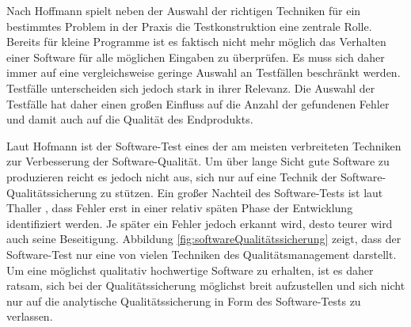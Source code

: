 Nach Hoffmann \cite[vgl. S.22]{hoffmann_software-qualitat_2013} spielt neben der Auswahl der richtigen Techniken für ein bestimmtes Problem in der Praxis die Testkonstruktion eine zentrale Rolle. Bereits für kleine Programme ist es faktisch nicht mehr möglich das Verhalten einer Software für alle möglichen Eingaben zu überprüfen. Es muss sich daher immer auf eine vergleichsweise geringe Auswahl an Testfällen beschränkt werden. Testfälle unterscheiden sich jedoch stark in ihrer Relevanz. Die Auswahl der Testfälle hat daher einen großen Einfluss auf die Anzahl der gefundenen Fehler und damit auch auf die Qualität des Endprodukts. 

Laut Hofmann \cite[vgl. S.22]{hoffmann_software-qualitat_2013} ist der Software-Test eines der am meisten verbreiteten Techniken zur Verbesserung der Software-Qualität. Um über lange Sicht gute Software zu produzieren reicht es jedoch nicht aus, sich nur auf eine Technik der Software-Qualitätssicherung zu stützen. Ein großer Nachteil des Software-Tests ist laut Thaller \cite[vgl. S.18]{thaller_software-test_2002}, dass Fehler erst in einer relativ späten Phase der Entwicklung identifiziert werden. Je später ein Fehler jedoch erkannt wird, desto teurer wird auch seine Beseitigung. Abbildung \ref{fig:softwareQualitätssicherung} zeigt, dass der Software-Test nur eine von vielen Techniken des Qualitätsmanagement darstellt. Um eine möglichst qualitativ hochwertige Software zu erhalten, ist es daher ratsam, sich bei der Qualitätssicherung möglichst breit aufzustellen und sich nicht nur auf die analytische Qualitätssicherung in Form des Software-Tests zu verlassen. 


